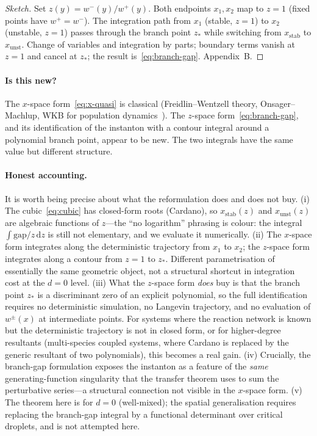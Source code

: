 \documentclass[11pt,a4paper]{article}
\newcommand{\dd}{\mathrm{d}}
\theoremstyle{plain}
\begin{document}
\begin{proof}[Sketch]
Set $z(y) = w^-(y)/w^+(y)$.  Both endpoints $x_1, x_2$ map to
$z = 1$ (fixed points have $w^+ = w^-$).  The integration path
from $x_1$ (stable, $z=1$) to $x_2$ (unstable, $z=1$) passes
through the branch point $z_*$ while switching from
$x_{\mathrm{stab}}$ to $x_{\mathrm{unst}}$.  Change of variables
and integration by parts; boundary terms vanish at $z=1$ and
cancel at $z_*$; the result is~\eqref{eq:branch-gap}.  Appendix~B.
\end{proof}

\paragraph{Is this new?}
The $x$-space form~\eqref{eq:x-quasi} is classical
(Freidlin--Wentzell theory, Onsager--Machlup, WKB for population
dynamics~\cite{ElgartKamenev,Meerson,DykmanRoss}).  The $z$-space
form~\eqref{eq:branch-gap}, and its identification of the
instanton with a contour integral around a polynomial branch
point, appear to be new.  The two integrals have the same value
but different structure.

\paragraph{Honest accounting.}
It is worth being precise about what the reformulation does and
does not buy.  (i) The cubic~\eqref{eq:cubic} has closed-form
roots (Cardano), so $x_{\mathrm{stab}}(z)$ and
$x_{\mathrm{unst}}(z)$ are algebraic functions of $z$---the
``no logarithm'' phrasing is colour: the integral
$\int\!\mathrm{gap}/z\,\dd z$ is still not elementary, and we
evaluate it numerically.  (ii) The $x$-space form integrates
along the deterministic trajectory from $x_1$ to $x_2$; the
$z$-space form integrates along a contour from $z=1$ to $z_*$.
Different parametrisation of essentially the same geometric
object, not a structural shortcut in integration cost at the
$d = 0$ level.  (iii) What the $z$-space form \emph{does} buy
is that the branch point $z_*$ is a discriminant zero of an
explicit polynomial, so the full identification requires no
deterministic simulation, no Langevin trajectory, and no
evaluation of $w^\pm(x)$ at intermediate points.  For systems
where the reaction network is known but the deterministic
trajectory is not in closed form, or for higher-degree resultants
(multi-species coupled systems, where Cardano is replaced by the
generic resultant of two polynomials), this becomes a real
gain.  (iv) Crucially, the branch-gap formulation exposes the
instanton as a feature of the \emph{same} generating-function
singularity that the transfer theorem uses to sum the
perturbative series---a structural connection not visible in the
$x$-space form.  (v) The theorem here is for $d = 0$ (well-mixed);
the spatial generalisation requires replacing the branch-gap
integral by a functional determinant over critical droplets, and
is not attempted here.
\end{document}
